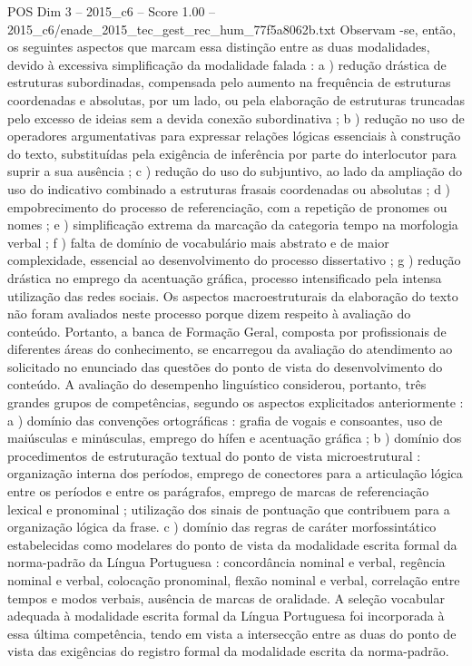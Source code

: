 \begin{textsample}{POS Dim 3 – 2015\_c6 – Score 1.00 – 2015\_c6/enade\_2015\_tec\_gest\_rec\_hum\_77f5a8062b.txt}
Observam -se, então, os seguintes aspectos que marcam essa distinção entre as duas modalidades, devido à excessiva simplificação da modalidade falada : a ) redução drástica de estruturas subordinadas, compensada pelo aumento na frequência de estruturas coordenadas e absolutas, por um lado, ou pela elaboração de estruturas truncadas pelo excesso de ideias sem a devida conexão subordinativa ; b ) redução no uso de operadores argumentativas para expressar relações lógicas essenciais à construção do texto, substituídas pela exigência de inferência por parte do interlocutor para suprir a sua ausência ; c ) redução do uso do subjuntivo, ao lado da ampliação do uso do indicativo combinado a estruturas frasais coordenadas ou absolutas ; d ) empobrecimento do processo de referenciação, com a repetição de pronomes ou nomes ; e ) simplificação extrema da marcação da categoria tempo na morfologia verbal ; f ) falta de domínio de vocabulário mais abstrato e de maior complexidade, essencial ao desenvolvimento do processo dissertativo ; g ) redução drástica no emprego da acentuação gráfica, processo intensificado pela intensa utilização das redes sociais.
Os aspectos macroestruturais da elaboração do texto não foram avaliados neste processo porque dizem respeito à avaliação do conteúdo.
Portanto, a banca de Formação Geral, composta por profissionais de diferentes áreas do conhecimento, se encarregou da avaliação do atendimento ao solicitado no enunciado das questões do ponto de vista do desenvolvimento do conteúdo.
A avaliação do desempenho linguístico considerou, portanto, três grandes grupos de competências, segundo os aspectos explicitados anteriormente : a ) domínio das convenções ortográficas : grafia de vogais e consoantes, uso de maiúsculas e minúsculas, emprego do hífen e acentuação gráfica ; b ) domínio dos procedimentos de estruturação textual do ponto de vista microestrutural : organização interna dos períodos, emprego de conectores para a articulação lógica entre os períodos e entre os parágrafos, emprego de marcas de referenciação lexical e pronominal ; utilização dos sinais de pontuação que contribuem para a organização lógica da frase. c ) domínio das regras de caráter morfossintático estabelecidas como modelares do ponto de vista da modalidade escrita formal da norma-padrão da Língua Portuguesa : concordância nominal e verbal, regência nominal e verbal, colocação pronominal, flexão nominal e verbal, correlação entre tempos e modos verbais, ausência de marcas de oralidade.
A seleção vocabular adequada à modalidade escrita formal da Língua Portuguesa foi incorporada à essa última competência, tendo em vista a intersecção entre as duas do ponto de vista das exigências do registro formal da modalidade escrita da norma-padrão.

\end{textsample}
